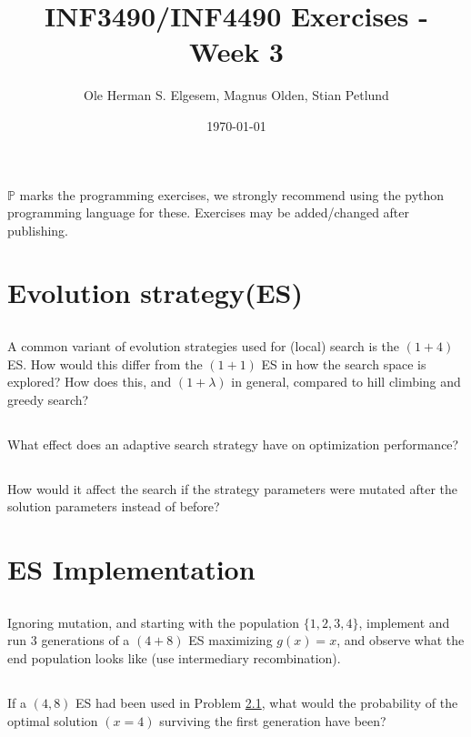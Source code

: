 \documentclass{article}           %
\title{\vspace{-2cm}INF3490/INF4490 Exercises - Week 3}
\author{Ole Herman S. Elgesem, Magnus Olden, Stian Petlund}
\date{\today}
\newcommand\marginsymbol[1][0pt]{%
  \tabto*{0cm}\makebox[\dimexpr-1cm-#1\relax][r]{$\mathbb{P}$}\tabto*{\TabPrevPos}}
\begin{document}
    \renewcommand\marginsymbol[1][0pt]{%
  \tabto*{0cm}\makebox[-1cm][c]{$\mathbb{P}$}\tabto*{\TabPrevPos}}

\maketitle
\(\mathbb{P}\) marks the programming exercises, we strongly recommend using
the python programming language for these. Exercises may be added/changed
after publishing.

\section{Evolution strategy(ES)} %
\subsection{} %
A common variant of evolution strategies used for (local) search is the \((1 + 4)\) ES.
How would this differ from the \((1 + 1)\) ES in how the search space is explored?
How does this, and \((1 + \lambda)\) in general, compared to hill climbing and greedy search?
\subsection{} %
What effect does an adaptive search strategy have on optimization performance?
\subsection{} %
How would it affect the search if the strategy parameters were mutated after the solution parameters instead of before?
\section{ES Implementation} %
\subsection{\marginsymbol} %
\label{subsec:w4e3a}
Ignoring mutation, and starting with the population \(\{1, 2, 3, 4\}\),
implement and run 3 generations of a \((4 + 8)\) ES maximizing \(g(x) = x\), and observe what the end population looks like (use intermediary recombination).
\subsection{} %
If a \((4, 8)\) ES had been used in Problem \ref{subsec:w4e3a}, what would the probability of the optimal solution \((x = 4)\) surviving the first generation have been?
\end{document}
